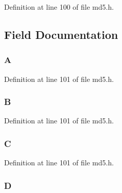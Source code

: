 Definition at line 100 of file md5.\+h.



\subsection{Field Documentation}
\subsubsection[{\texorpdfstring{A}{A}}]{ A}\hypertarget{struct_m_d5state__st_a25d52493de39cc49240458df3f8a9dd1}{}\label{struct_m_d5state__st_a25d52493de39cc49240458df3f8a9dd1}


Definition at line 101 of file md5.\+h.

\subsubsection[{\texorpdfstring{B}{B}}]{ B}\hypertarget{struct_m_d5state__st_a890388c772cb0780641341a16f315397}{}\label{struct_m_d5state__st_a890388c772cb0780641341a16f315397}


Definition at line 101 of file md5.\+h.

\subsubsection[{\texorpdfstring{C}{C}}]{ C}\hypertarget{struct_m_d5state__st_a3291114b2da7fbfc5ec7040e01a520c1}{}\label{struct_m_d5state__st_a3291114b2da7fbfc5ec7040e01a520c1}


Definition at line 101 of file md5.\+h.

\subsubsection[{\texorpdfstring{D}{D}}]{ D}\hypertarget{struct_m_d5state__st_ad09ad8fc5658de9909f835ccd5038407}{}\label{struct_m_d5state__st_ad09ad8fc5658de9909f835ccd5038407}


